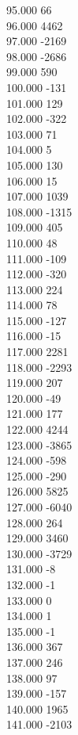 { 95.000	66 \\
 96.000	4462 \\
 97.000	-2169 \\
 98.000	-2686 \\
 99.000	590 \\
 100.000	-131 \\
 101.000	129 \\
 102.000	-322 \\
 103.000	71 \\
 104.000	5 \\
 105.000	130 \\
 106.000	15 \\
 107.000	1039 \\
 108.000	-1315 \\
 109.000	405 \\
 110.000	48 \\
 111.000	-109 \\
 112.000	-320 \\
 113.000	224 \\
 114.000	78 \\
 115.000	-127 \\
 116.000	-15 \\
 117.000	2281 \\
 118.000	-2293 \\
 119.000	207 \\
 120.000	-49 \\
 121.000	177 \\
 122.000	4244 \\
 123.000	-3865 \\
 124.000	-598 \\
 125.000	-290 \\
 126.000	5825 \\
 127.000	-6040 \\
 128.000	264 \\
 129.000	3460 \\
 130.000	-3729 \\
 131.000	-8 \\
 132.000	-1 \\
 133.000	0 \\
 134.000	1 \\
 135.000	-1 \\
 136.000	367 \\
 137.000	246 \\
 138.000	97 \\
 139.000	-157 \\
 140.000	1965 \\
 141.000	-2103 \\
}
